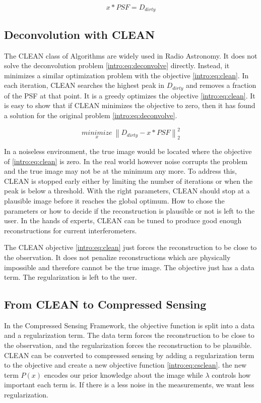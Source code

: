 \begin{equation}\label{intro:eq:deconvolve}
x \ast  PSF = D_{dirty} 
\end{equation}


\subsection{Deconvolution with CLEAN}
The CLEAN class of Algorithms\cite{hogbom1974aperture}\cite{schwab1984relaxing}\cite{rich2008multi}\cite{rau2011multi} are widely used in Radio Astronomy. It does not solve the deconvolution problem \eqref{intro:eq:deconvolve} directly. Instead, it minimizes a similar optimization problem with the objective  \eqref{intro:eq:clean}. In each iteration, CLEAN searches the highest peak in $D_{dirty}$ and removes a fraction of the PSF at that point. It is a greedy optimizes the objective \eqref{intro:eq:clean}. It is easy to show that if CLEAN minimizes the objective to zero, then it has found a solution for the original problem \eqref{intro:eq:deconvolve}. 

\begin{equation}\label{intro:eq:clean}
\underset{x}{minimize} \: \left \| D_{dirty} - x \ast PSF \right \|_2^2
\end{equation}

In a noiseless environment, the true image would be located where the objective of \eqref{intro:eq:clean} is zero. In the real world however noise corrupts the problem and the true image may not be at the minimum any more. To address this, CLEAN is stopped early either by limiting the number of iterations or when the peak is below a threshold. With the right parameters, CLEAN should stop at a plausible image before it reaches the global optimum. How to chose the parameters or how to decide if the reconstruction is plausible or not is left to the user. In the hands of experts, CLEAN can be tuned to produce good enough reconstructions for current interferometers. 

The CLEAN objective \eqref{intro:eq:clean} just forces the reconstruction to be close to the observation. It does not penalize reconstructions which are physically impossible and therefore cannot be the true image. The objective just has a data term. The regularization is left to the user. 


\subsection{From CLEAN to Compressed Sensing}
In the Compressed Sensing Framework, the objective function is split into a data and a regularization term. The data term forces the reconstruction to be close to the observation, and the regularization forces the reconstruction to be plausible. CLEAN can be converted to compressed sensing by adding a regularization term to the objective and create a new objective function \eqref{intro:eq:csclean}. the new term $P(x)$ encodes our prior knowledge about the image while $\lambda$ controls how important each term is. If there is a less noise in the measurements, we want less regularization.


